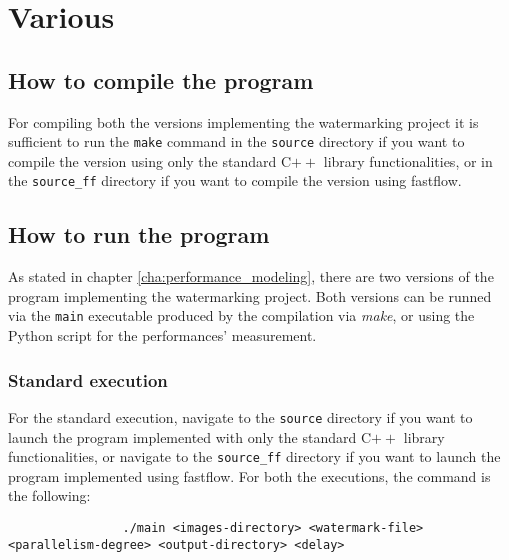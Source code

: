 \chapter{Various} %
\label{cha:various}
    \section{How to compile the program} %
    \label{sec:how_to_compile_the_program}
        For compiling both the versions implementing the watermarking project it is sufficient to run the
        \texttt{make} command in the \texttt{source} directory if you want to compile the version using only the
        standard C$++$ library functionalities, or in the \texttt{source\_ff} directory if you want to compile
        the version using fastflow.
    \section{How to run the program} %
    \label{sec:how_to_run_the_program}
        As stated in chapter \ref{cha:performance_modeling}, there are two versions of the program implementing
        the watermarking project. Both versions can be runned via the \texttt{main} executable produced by the
        compilation via \textit{make}, or using the Python script for the performances' measurement.
        \subsection{Standard execution} %
        \label{sub:standard_execution}
            For the standard execution, navigate to the \texttt{source} directory if you want to launch the
            program implemented with only the standard C$++$ library functionalities, or navigate to the
            \texttt{source\_ff} directory if you want to launch the program implemented using fastflow.
            For both the executions, the command is the following:

            \begin{verbatim}
                ./main <images-directory> <watermark-file> <parallelism-degree> <output-directory> <delay>
            \end{verbatim}

